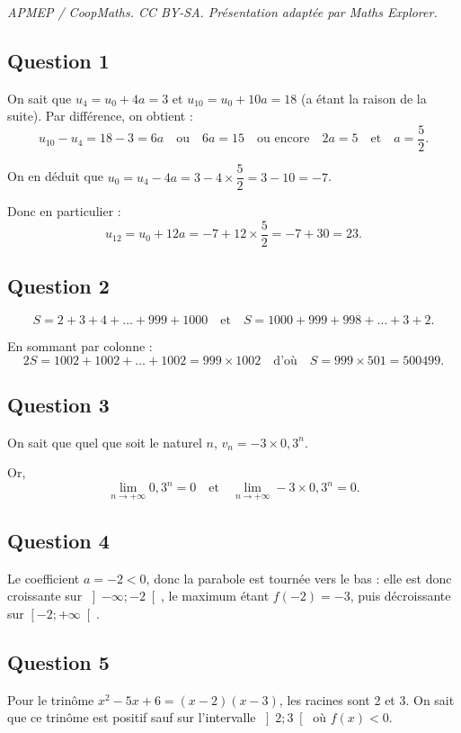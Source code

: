\documentclass[10pt]{article}
\begin{document}
\noindent\textit{APMEP / CoopMaths. CC BY-SA. Présentation adaptée par Maths Explorer.}\par\medskip
\subsection*{Question 1}
	
	On sait que \(u_4 = u_0 + 4a = 3\) et \(u_{10} = u_0 + 10a = 18\) (a étant la raison de la suite). Par différence, on obtient :
	\[
	u_{10} - u_4 = 18 - 3 = 6a \quad \text{ou} \quad 6a = 15 \quad \text{ou encore} \quad 2a = 5 \quad \text{et} \quad a = \dfrac{5}{2}.
	\]
	
	On en déduit que \(u_0 = u_4 - 4a = 3 - 4 \times \dfrac{5}{2} = 3 - 10 = -7\).
	
	Donc en particulier :
	\[
	u_{12} = u_0 + 12a = -7 + 12 \times \dfrac{5}{2} = -7 + 30 = 23.
	\]
	
	\subsection*{Question 2}
	
	\[
	S = 2 + 3 + 4 + \ldots + 999 + 1000 \quad \text{et} \quad S = 1000 + 999 + 998 + \ldots + 3 + 2.
	\]
	
	En sommant par colonne :
	\[
	2S = 1002 + 1002 + \ldots + 1002 = 999 \times 1002 \quad \text{d’où} \quad S = 999 \times 501 = 500499.
	\]
	
	\subsection*{Question 3}
	
	On sait que quel que soit le naturel \(n\), \(v_n = -3 \times 0,3^n\).
	
	Or,
	\[
	\lim_{n \to +\infty} 0,3^n = 0 \quad \text{et} \quad \lim_{n \to +\infty} -3 \times 0,3^n = 0.
	\]
	
	\subsection*{Question 4}
	
	Le coefficient \(a = -2 < 0\), donc la parabole est tournée vers le bas : elle est donc croissante sur \(\left]-\infty ; -2\right[\), le maximum étant \(f(-2) = -3\), puis décroissante sur \(\left[-2 ; +\infty\right[\).
	
	\subsection*{Question 5}
	
	Pour le trinôme \(x^2 - 5x + 6 = (x - 2)(x - 3)\), les racines sont 2 et 3. On sait que ce trinôme est positif sauf sur l’intervalle \(\left]2 ; 3\right[\) où \(f(x) < 0\).
\end{document}
